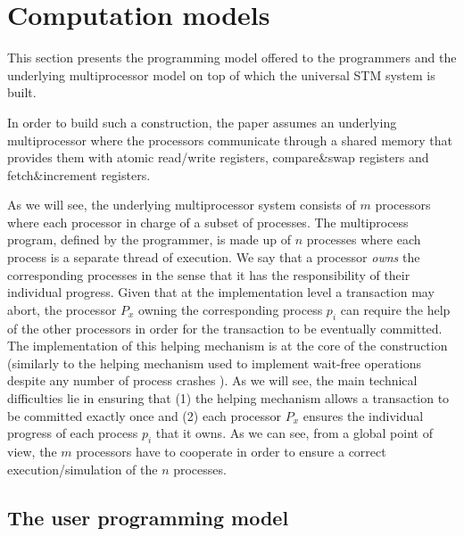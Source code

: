 \section{Computation models}
\label{sec:models}

This section presents the programming model offered to the programmers
and  the underlying  multiprocessor model on top of which  the universal STM 
system is built. 






In order to build such a construction, the paper assumes an underlying 
multiprocessor where the processors  communicate through 
a shared memory that provides them with atomic read/write registers, 
compare\&swap registers and fetch\&increment registers. 




As we will see, the underlying multiprocessor system  consists of 
$m$  processors where each processor  in charge  of a  subset of  processes.
The  multiprocess program, defined  by the  programmer, is  made up  of $n$
processes  where each process is a separate thread of execution.
  We say that a processor {\it owns}
the corresponding processes in the sense that  it has the responsibility 
of their individual   progress.  Given that at  the implementation level
a  transaction may abort, the processor $P_x$ owning the corresponding 
process $p_i$ can  require the help of  the other  processors  
in order for the transaction to be eventually committed. 
The  implementation of this  helping mechanism  is at the core of the 
construction  (similarly to the helping mechanism used  to implement 
wait-free operations despite any number of process crashes \cite{H91}). 
As we  will  see, the  main technical difficulties  lie  in   ensuring that 
(1) the helping  mechanism  allows   a transaction to be committed  exactly
once and (2) each processor $P_x$ ensures the individual progress  of  each 
process $p_i$ that it owns. As we can see, from a global point of view,
the  $m$ processors have to    cooperate in order to ensure a correct
execution/simulation of the $n$  processes. 
  









\subsection{The  user programming model}

